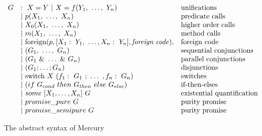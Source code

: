 \begin{figure}
\[
\begin{array}{lll}
G
    & :~ X = Y ~|~ X = f(Y_1,~\ldots,~Y_n)
        & \hbox{unifications}\\
    & |~ p(X_1,~\ldots,~X_n)
        & \hbox{predicate calls} \\
    & |~ X_0(X_1,~\ldots,~X_n)
        & \hbox{higher order calls} \\
    & |~ m(X_1,~\ldots,~X_n)
        & \hbox{method calls} \\
    & |~ \hbox{foreign}(p,
        [X_1:~Y_1,~\ldots,X_n:~Y_n],
        \hbox{\emph{foreign code}}),
        & \hbox{foreign code} \\
    & |~ (G_1,~\ldots,~G_n)
        & \hbox{sequential conjunctions}\\
    & |~ (G_1~\&~\ldots~\&~G_n)
        & \hbox{parallel conjunctions}\\
    & |~ (G_1 ; \ldots ; G_n)
        & \hbox{disjunctions}\\
    & |~ \hbox{switch}~X~(f_1:~G_1~;~\ldots~,f_n:~G_n)
        & \hbox{switches}\\
    & |~ (if~G_{cond}~then~G_{then}~else~G_{else})
        & \hbox{if-then-elses}\\
    & |~ some~[X_1,\ldots,X_n]~G
        & \hbox{existential quantification}\\
    & |~ promise\_pure~G
        & \hbox{purity promise}\\
    & |~ promise\_semipure~G
        & \hbox{purity promise}\\
\end{array}
\]
\caption{The abstract syntax of Mercury}
\label{fig:abstractsyntax}
\end{figure}

